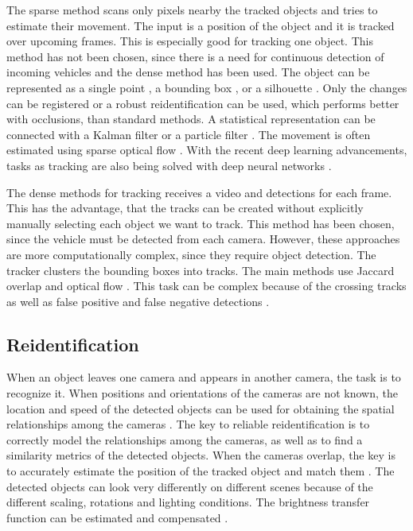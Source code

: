 \documentclass[a4paper,11pt,titlepage,twoside]{article}
\numberwithin{figure}{section}
\begin{document}
The sparse method scans only pixels nearby the tracked objects and tries to estimate their movement. The input is a position of the object and it is tracked over upcoming frames. This is especially good for tracking one object. This method has not been chosen, since there is a need for continuous detection of incoming vehicles and the dense method has been used. The object can be represented as a single point \cite{kale2015moving}, a bounding box \cite{comaniciu2003kernel, porikli2005multi, yilmaz2007object, elgammal2002background}, or a silhouette \cite{isard2001bramble}. Only the changes can be registered \cite{kale2015moving} or a robust reidentification \cite{veenman1998fast} can be used, which performs better with occlusions, than standard methods. A statistical representation can be connected with a Kalman filter \cite{banerjee2008multi} or a particle filter \cite{zhong2012moving}. The movement is often estimated using sparse optical flow \cite{kale2015moving, mae1996object}. With the recent deep learning advancements, tasks as tracking are also being solved with deep neural networks \cite{bertinetto2016fully, held2016learning, gladh2016deep, gaidon2016virtual, lee2016globally}.

The dense methods for tracking receives a video and detections for each frame. This has the advantage, that the tracks can be created without explicitly manually selecting each object we want to track. This method has been chosen, since the vehicle must be detected from each camera. However, these approaches are more computationally complex, since they require object detection. The tracker clusters the bounding boxes into tracks. The main methods use Jaccard overlap \cite{tan2005introduction, benfold2011stable} and optical flow \cite{chen2011tracking}. This task can be complex because of the crossing tracks as well as false positive and false negative detections \cite{joshi2012survey, elgammal2002background}.

\subsection{Reidentification}
When an object leaves one camera and appears in another camera, the task is to recognize it. When positions and orientations of the cameras are not known, the location and speed of the detected objects can be used for obtaining the spatial relationships among the cameras \cite{makris2004bridging}. The key to reliable reidentification is to correctly model the relationships among the cameras, as well as to find a similarity metrics of the detected objects. When the cameras overlap, the key is to accurately estimate the position of the tracked object and match them \cite{khan2003consistent, krumm2000multi, zhao2005real}. The detected objects can look very differently on different scenes because of the different scaling, rotations and lighting conditions. The brightness transfer function can be estimated and compensated \cite{javed2005appearance, porikli2003inter}. 
\end{document}

